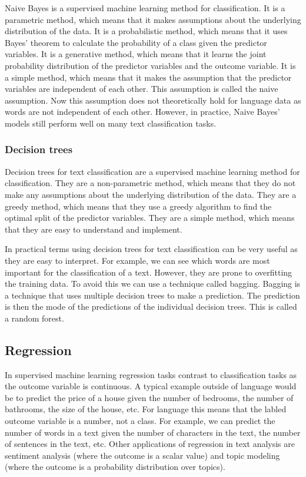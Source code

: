 \documentclass[
  letterpaper,
]{latex/krantz}
\begin{document}
Naive Bayes is a supervised machine learning method for classification.
It is a parametric method, which means that it makes assumptions about
the underlying distribution of the data. It is a probabilistic method,
which means that it uses Bayes' theorem to calculate the probability of
a class given the predictor variables. It is a generative method, which
means that it learns the joint probability distribution of the predictor
variables and the outcome variable. It is a simple method, which means
that it makes the assumption that the predictor variables are
independent of each other. This assumption is called the naive
assumption. Now this assumption does not theoretically hold for language
data as words are not independent of each other. However, in practice,
Naive Bayes' models still perform well on many text classification
tasks.

\hypertarget{pda-decision-trees}{%
\subsubsection{Decision trees}\label{pda-decision-trees}}

Decision trees for text classification are a supervised machine learning
method for classification. They are a non-parametric method, which means
that they do not make any assumptions about the underlying distribution
of the data. They are a greedy method, which means that they use a
greedy algorithm to find the optimal split of the predictor variables.
They are a simple method, which means that they are easy to understand
and implement.

In practical terms using decision trees for text classification can be
very useful as they are easy to interpret. For example, we can see which
words are most important for the classification of a text. However, they
are prone to overfitting the training data. To avoid this we can use a
technique called bagging. Bagging is a technique that uses multiple
decision trees to make a prediction. The prediction is then the mode of
the predictions of the individual decision trees. This is called a
random forest.

\hypertarget{pda-regression}{%
\subsection{Regression}\label{pda-regression}}

In supervised machine learning regression tasks contrast to
classification tasks as the outcome variable is continuous. A typical
example outside of language would be to predict the price of a house
given the number of bedrooms, the number of bathrooms, the size of the
house, etc. For language this means that the labled outcome variable is
a number, not a class. For example, we can predict the number of words
in a text given the number of characters in the text, the number of
sentences in the text, etc. Other applications of regression in text
analysis are sentiment analysis (where the outcome is a scalar value)
and topic modeling (where the outcome is a probability distribution over
topics).
\end{document}
